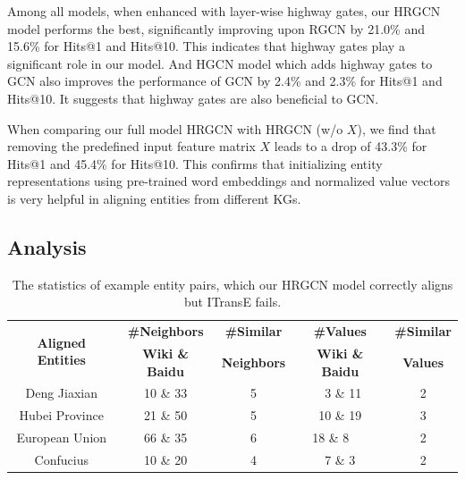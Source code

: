 	Among all models, when enhanced with layer-wise highway gates, our HRGCN model performs the best, significantly improving upon RGCN by 21.0\% and 15.6\% for Hits@1 and Hits@10. This indicates that highway gates play a significant role in our model. And HGCN model which adds highway gates to GCN also improves the performance of GCN by 2.4\% and 2.3\% for Hits@1 and Hits@10. It suggests that highway gates are also beneficial to GCN.
	
	When comparing our full model HRGCN with HRGCN (w/o $X$), we find that removing the predefined input feature matrix $X$ leads to a drop of 43.3\% for Hits@1 and 45.4\% for Hits@10. This confirms that initializing entity representations using pre-trained word embeddings and normalized value vectors is very helpful in aligning entities from different KGs.
	
		
	
	
	\subsection{Analysis}
	

\begin{table}
	\centering
	\scriptsize
	\begin{tabular}{ccccc}
		\toprule
		\multirow{2}{*}{\bf Aligned Entities} & \bf \#Neighbors & \bf \#Similar & \bf \#Values & \bf \#Similar \\
		&\bf  Wiki \& Baidu &\bf  Neighbors &\bf  Wiki \& Baidu &\bf  Values \\
		\midrule
		Deng Jiaxian & 10 \& 33 & 5 & \ 3 \& 11 & 2\\
		Hubei Province & 21 \& 50 & 5 & 10 \& 19 & 3\\
		European Union & 66 \& 35 & 6 & 18 \& 8\ \ \ & 2\\
		Confucius & 10 \& 20 & 4 & 7 \& 3 & 2\\
		\bottomrule
	\end{tabular}
	\caption{The statistics of example entity pairs, which our HRGCN model correctly aligns but ITransE fails.}
	\label{example}
\end{table}
	
